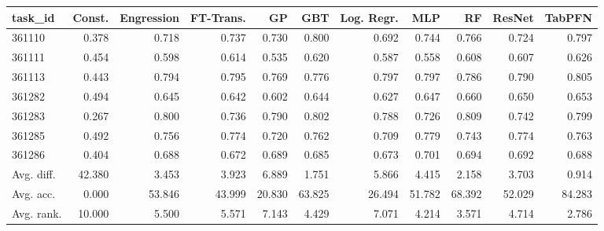 \begin{tabular}{lrrrrrrrrrr}
\toprule
task\_id & Const. & Engression & FT-Trans. & GP & GBT & Log. Regr. & MLP & RF & ResNet & TabPFN \\
\midrule
361110 & 0.378 & 0.718 & 0.737 & 0.730 & 0.800 & 0.692 & 0.744 & 0.766 & 0.724 & 0.797 \\
361111 & 0.454 & 0.598 & 0.614 & 0.535 & 0.620 & 0.587 & 0.558 & 0.608 & 0.607 & 0.626 \\
361113 & 0.443 & 0.794 & 0.795 & 0.769 & 0.776 & 0.797 & 0.797 & 0.786 & 0.790 & 0.805 \\
361282 & 0.494 & 0.645 & 0.642 & 0.602 & 0.644 & 0.627 & 0.647 & 0.660 & 0.650 & 0.653 \\
361283 & 0.267 & 0.800 & 0.736 & 0.790 & 0.802 & 0.788 & 0.726 & 0.809 & 0.742 & 0.799 \\
361285 & 0.492 & 0.756 & 0.774 & 0.720 & 0.762 & 0.709 & 0.779 & 0.743 & 0.774 & 0.763 \\
361286 & 0.404 & 0.688 & 0.672 & 0.689 & 0.685 & 0.673 & 0.701 & 0.694 & 0.692 & 0.688 \\
Avg. diff. & 42.380 & 3.453 & 3.923 & 6.889 & 1.751 & 5.866 & 4.415 & 2.158 & 3.703 & 0.914 \\
Avg. acc. & 0.000 & 53.846 & 43.999 & 20.830 & 63.825 & 26.494 & 51.782 & 68.392 & 52.029 & 84.283 \\
Avg. rank. & 10.000 & 5.500 & 5.571 & 7.143 & 4.429 & 7.071 & 4.214 & 3.571 & 4.714 & 2.786 \\
\bottomrule
\end{tabular}

